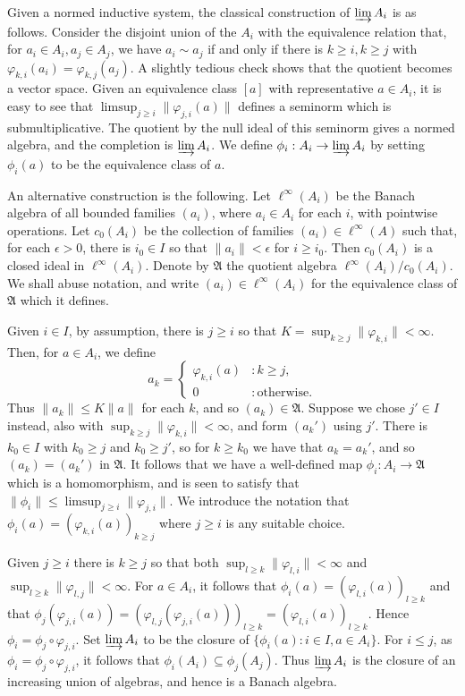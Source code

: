 \documentclass[a4paper,11pt]{article}
\newcommand{\mf}{\mathfrak}
\newcommand{\indlim}{\varinjlim}
\theoremstyle{definition}
\begin{document}
Given a normed inductive system, the classical construction of $\indlim A_i$ is as follows.
Consider the disjoint union of the $A_i$ with the equivalence relation that, for $a_i\in A_i,
a_j\in A_j$, we have $a_i \sim a_j$ if and only if there is $k\geq i, k\geq j$ with
$\varphi_{k,i}(a_i) = \varphi_{k,j}(a_j)$.  A slightly tedious check shows that the quotient becomes
a vector space.  Given an equivalence class $[a]$ with representative $a\in A_i$, it is easy to see
that $\limsup_{j\geq i} \|\varphi_{j,i}(a)\|$ defines a seminorm which is submultiplicative.
The quotient by the null ideal of this seminorm gives a normed algebra, and the completion is
$\indlim A_i$.  We define $\phi_i:A_i \rightarrow \indlim A_i$ by setting $\phi_i(a)$ to
be the equivalence class of $a$.

An alternative construction is the following.  Let $\ell^\infty(A_i)$ be the Banach algebra of all
bounded families $(a_i)$, where $a_i\in A_i$ for each $i$, with pointwise operations.
Let $c_0(A_i)$ be the collection of families $(a_i)\in \ell^\infty(A)$ such that, for each
$\epsilon>0$, there is $i_0\in I$ so that $\|a_i\|<\epsilon$ for $i\geq i_0$.  Then $c_0(A_i)$
is a closed ideal in $\ell^\infty(A_i)$.  Denote by $\mf A$ the quotient algebra
$\ell^\infty(A_i) / c_0(A_i)$.  We shall abuse notation, and write $(a_i)\in\ell^\infty(A_i)$
for the equivalence class of $\mf A$ which it defines.

Given $i\in I$, by assumption, there is $j\geq i$ so that
$K = \sup_{k\geq j} \|\varphi_{k,i}\| < \infty$.  Then, for $a\in A_i$, we define
\[ a_k = \begin{cases} \varphi_{k,i}(a) & : k\geq j, \\ 0 & : \text{otherwise}. \end{cases} \]
Thus $\|a_k\| \leq K\|a\|$ for each $k$, and so $(a_k) \in \mf A$.  Suppose we chose $j'\in I$
instead, also with $\sup_{k\geq j} \|\varphi_{k,i}\| < \infty$, and form $(a_k')$ using $j'$.
There is $k_0\in I$ with $k_0 \geq j$ and $k_0 \geq j'$, so for $k\geq k_0$ we have that
$a_k = a_k'$, and so $(a_k) = (a_k')$ in $\mf A$.  It follows that we have a well-defined map
$\phi_i:A_i\rightarrow\mf A$ which is a homomorphism, and is seen to satisfy that $\|\phi_i\| \leq
\limsup_{j\geq i} \|\varphi_{j,i}\|$.  We introduce the notation that $\phi_i(a) =
( \varphi_{k,i}(a) )_{k\geq j}$ where $j\geq i$ is any suitable choice.

Given $j\geq i$ there is $k\geq j$ so that both $\sup_{l\geq k} \|\varphi_{l,i}\|<\infty$ and
$\sup_{l\geq k} \|\varphi_{l,j}\|<\infty$.  For $a\in A_i$, it follows that $\phi_i(a) =
( \varphi_{l,i}(a) )_{l\geq k}$ and that $\phi_j(\varphi_{j,i}(a)) =
( \varphi_{l,j}(\varphi_{j,i}(a)) )_{l\geq k} = 
( \varphi_{l,i}(a) )_{l\geq k}$.  Hence $\phi_i = \phi_j \circ \varphi_{j,i}$.
Set $\indlim A_i$ to be the closure of $\{\phi_i(a) : i\in I, a\in A_i \}$.  For $i\leq j$, as
$\phi_i = \phi_j \circ \varphi_{j,i}$, it follows that $\phi_i(A_i) \subseteq \phi_j(A_j)$.
Thus $\indlim A_i$ is the closure of an increasing union of algebras, and hence is a Banach algebra.
\end{document}
